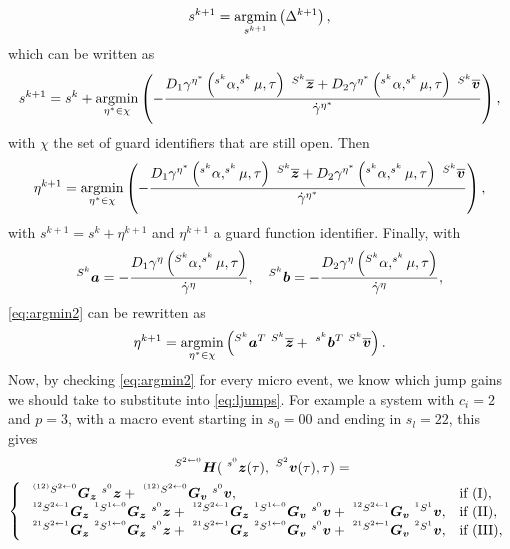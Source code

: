 \documentclass[../DC2017114Bouma.tex]{subfiles}
\begin{document}
\begin{align}
s^{k+1} = \underset{s^{k+1}}{\operatorname{\text{argmin}}}\left(\Delta^{k+1}\right),
\end{align}
which can be written as
\begin{align}
s^{k+1} = s^k + \underset{\eta^*\in\chi}{\argmin}\left(-\frac{D_1\gamma^{\eta^*}\left(^{s^k}\alpha,^{s^k}\mu,\tau\right)\ ^{S^k}\overline{\zb} + D_2\gamma^{\eta^*}\left(^{s^k}\alpha,^{s^k}\mu,\tau\right)\ ^{S^k}\overline{\vb}}{\dot{\gamma}^{\eta^*}}\right),
\end{align}
with $\chi$ the set of guard identifiers that are still open. Then
\begin{align}
\eta^{k+1} = \underset{\eta^*\in\chi}{\argmin}\left(-\frac{D_1\gamma^{\eta^*}\left(^{s^k}\alpha,^{s^k}\mu,\tau\right)\ ^{S^k}\overline{\zb} + D_2\gamma^{\eta^*}\left(^{s^k}\alpha,^{s^k}\mu,\tau\right)\ ^{S^k}\overline{\vb}}{\dot{\gamma}^{\eta^*}}\right),\label{eq:argmin2}
\end{align}
with $s^{k+1} = s^k + \eta^{k+1}$ and $\eta^{k+1}$ a guard function identifier. Finally, with
\begin{align}
^{S^k}{\boldsymbol{a}} = -\frac{D_1\gamma^{\eta}\left(^{S^k}\alpha,^{s^k}\mu,\tau\right)}{\dot{\gamma}^{\eta}},
\quad
^{S^k}{\boldsymbol{b}} = -\frac{D_2\gamma^{\eta}\left(^{S^k}\alpha,^{s^k}\mu,\tau\right)}{\dot{\gamma}^{\eta}},
\end{align}
\eqref{eq:argmin2} can be rewritten as
\begin{align}
\eta^{k+1} = \underset{\eta^*\in\chi}{\argmin}\left(^{S^k}\ab^T\ ^{S^k}\overline{\zb} +\  ^{s^k}\bb^T\ ^{S^k}\overline{\vb}\right).
\end{align}
Now, by checking \eqref{eq:argmin2} for every micro event, we know which jump gains we should take to substitute into \eqref{eq:ljumps}.
For example a system with $c_i = 2$ and $p = 3$, with a macro event starting in $s_0 = 00$ and ending in $s_l = 22$, this gives 
\begin{multline}
\ ^{ S^{2\leftarrow 0}}\Hb(\ ^{s^0}\zb(\tau),\ ^{S^2}\vb(\tau),\tau) =\\ \left\lbrace\begin{array}{ll}
\ ^{^{(12)} S^{2\leftarrow 0}}\Gb_\zb\ ^{s^0}\zb + \ ^{^{(12)} S^{2\leftarrow 0}}\Gb_\vb\ ^{s^0}\vb, & \text{if }(\text{I}),\\
\ ^{^{12} S^{2\leftarrow 1}}\Gb_\zb\ ^{^{1} S^{1\leftarrow 0}}\Gb_\zb\ ^{s^0}\zb + \ ^{^{12} S^{2\leftarrow 1}}\Gb_\zb\ ^{^{1} S^{1\leftarrow 0}}\Gb_\vb\ ^{s^0}\vb + \ ^{^{12} S^{2\leftarrow 1}}\Gb_\vb\ ^{^1 S^1}\vb, & \text{if }(\text{II}),\\
\ ^{^{21} S^{2\leftarrow 1}}\Gb_\zb\ ^{^{2} S^{1\leftarrow 0}}\Gb_\zb\ ^{s^0}\zb + \ ^{^{21} S^{2\leftarrow 1}}\Gb_\zb\ ^{^{2} S^{1\leftarrow 0}}\Gb_\vb\ ^{s^0}\vb + \ ^{^{21} S^{2\leftarrow 1}}\Gb_\vb\ ^{^{2} S^1}\vb, & \text{if }(\text{III}),
\end{array}\right.\label{eq:H2200}
\end{multline}
\end{document}
